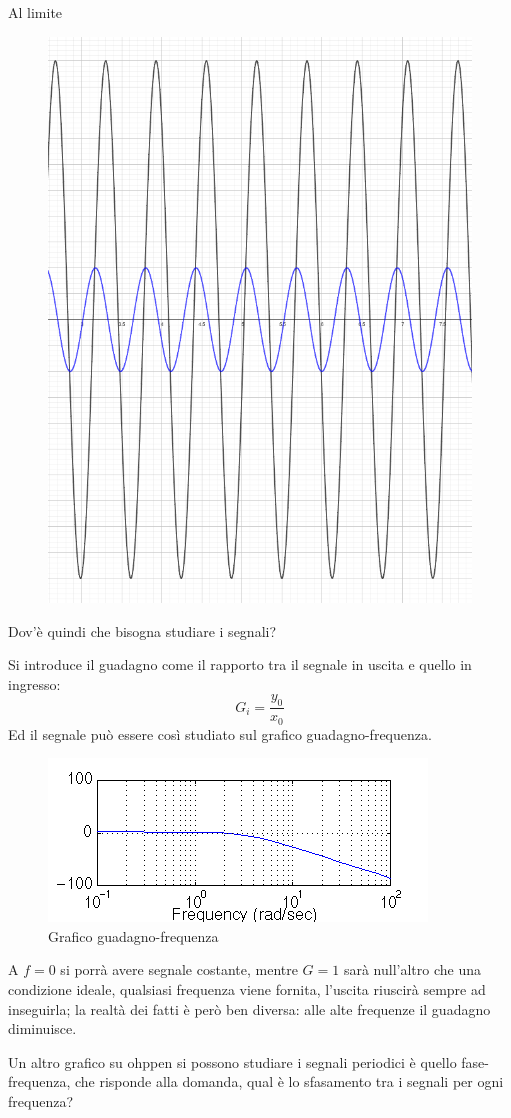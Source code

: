 \documentclass[a4paper, 15pt]{article}
\begin{document}
\begin{adjustwidth}{2in}{}
	Al limite 	
\begin{figure}[H]
	\centering
	\includegraphics[width=0.3\linewidth]{fig/bassafreq3}
	\label{fig:bassafreq3}
\end{figure}


	Dov'è quindi che bisogna studiare i segnali? 
	
	Si introduce il guadagno come il rapporto tra il segnale in uscita e quello in ingresso: 
	\[ G_i = \dfrac{y_0}{x_0}\]
\newpage
	Ed il segnale può essere così studiato sul grafico guadagno-frequenza.
\begin{figure}[H]
	\centering
	\includegraphics[width=0.5\linewidth]{fig/nyquist1}
	\caption{Grafico guadagno-frequenza}
	\label{fig:nyquist1}
\end{figure}
	A $f=0$ si porrà avere segnale costante, mentre $G=1$ sarà null'altro che una condizione ideale, qualsiasi frequenza viene fornita, l'uscita riuscirà sempre ad inseguirla; la realtà dei fatti è però ben diversa: alle alte frequenze il guadagno diminuisce.  \newline 
	
	Un altro grafico su ohppen si possono studiare i segnali periodici è quello fase-frequenza, che risponde alla domanda, qual è lo sfasamento tra i segnali per ogni frequenza? 	


\end{adjustwidth}
\end{document}
